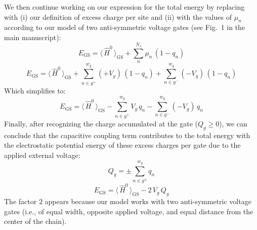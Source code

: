 \documentclass[aps, prd, reprint]{revtex4-2}
\begin{document}
We then continue working on our expression for the total energy by replacing with (i) our definition of excess charge per site and (ii) with the values of $\mu_{n}$ according to our model of two anti-symmetric voltage gates (see Fig.~1 in the main manuscript):
\[
E_{\mathrm{GS}} = \langle\, \hat{H}^{0} \,\rangle_{\mathrm{GS}} + \sum_{n}^{N_{s}} \mu_{n} \, (1 - q_{n})
\]\[
E_{\mathrm{GS}} = \langle\, \hat{H}^{0} \,\rangle_{\mathrm{GS}} + \sum_{n \in g^{+}}^{w_{g}} (+V_{g}) \, (1 - q_{n}) + \sum_{n \in g^{-}}^{w_{g}} (-V_{g}) \, (1 - q_{n})
\]
Which simplifies to:
\[
E_{\mathrm{GS}} = \langle\, \hat{H}^{0} \,\rangle_{\mathrm{GS}} - \sum_{n \in g^{+}}^{w_{g}} V_{g} \, q_{n} - \sum_{n \in g^{-}}^{w_{g}} (-V_{g}) \, q_{n}
\]
Finally, after recognizing the charge accumulated at the gate (${Q_{g} \ge 0}$), we can conclude that the capacitive coupling term contributes to the total energy with the electrostatic potential energy of these excess charges per gate due to the applied external voltage:
\[
Q_{g} = \pm \sum_{n \in g^{\pm}}^{w_{g}} q_{n}
\]\[
E_{\mathrm{GS}} = \langle\, \hat{H}^{0} \,\rangle_{\mathrm{GS}} - 2\, V_{g} \, Q_{g}
\]
The factor $2$ appears because our model works with two anti-symmetric voltage gates (i.e., of equal width, opposite applied voltage, and equal distance from the center of the chain).

\newpage

\onecolumngrid
\end{document}
